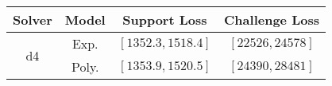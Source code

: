 \begin{tabular}{cc|c|c} 
\hline 
 Solver & Model & Support Loss  & Challenge Loss \tabularnewline\hline 
\hline 
\multirow{2}{*}{d4} & Exp. & $\left[1352.3,1518.4\right]$ & $\left[22526,24578\right]$ \tabularnewline 
 & Poly. & $\left[1353.9,1520.5\right]$ & $\left[24390,28481\right]$ \tabularnewline 
\hline 
\end{tabular} 

